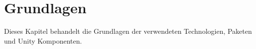 \chapter{Grundlagen}
\label{sec:grundlagen}
Dieses Kapitel behandelt die Grundlagen der verwendeten Technologien, Paketen und Unity Komponenten.


